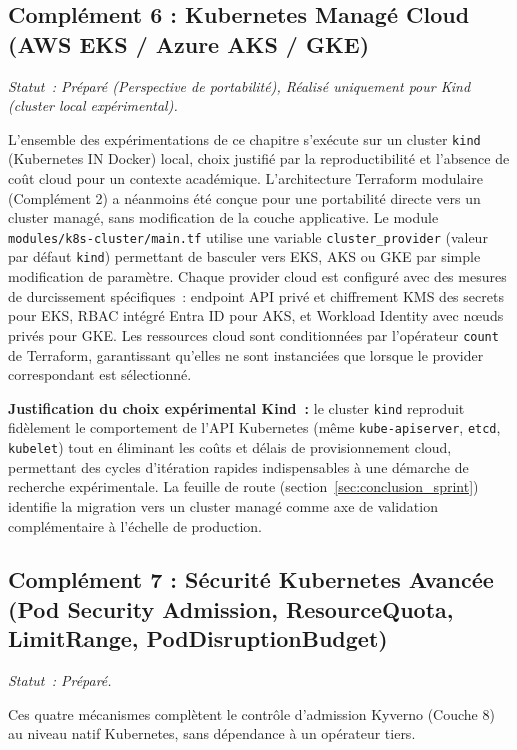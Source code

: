\subsection{Complément 6 : Kubernetes Managé Cloud (AWS EKS / Azure AKS / GKE)}
\label{subsec:comp_cloud_k8s}
\textit{Statut~: Préparé (Perspective de portabilité), Réalisé uniquement pour Kind (cluster local expérimental).}

L'ensemble des expérimentations de ce chapitre s'exécute sur un cluster \texttt{kind} (Kubernetes IN Docker) local, choix justifié par la reproductibilité et l'absence de coût cloud pour un contexte académique. L'architecture Terraform modulaire (Complément 2) a néanmoins été conçue pour une portabilité directe vers un cluster managé, sans modification de la couche applicative. Le module \texttt{modules/k8s-cluster/main.tf} utilise une variable \texttt{cluster\_provider} (valeur par défaut \texttt{kind}) permettant de basculer vers EKS, AKS ou GKE par simple modification de paramètre. Chaque provider cloud est configuré avec des mesures de durcissement spécifiques~: endpoint API privé et chiffrement KMS des secrets pour EKS, RBAC intégré Entra ID pour AKS, et Workload Identity avec nœuds privés pour GKE. Les ressources cloud sont conditionnées par l'opérateur \texttt{count} de Terraform, garantissant qu'elles ne sont instanciées que lorsque le provider correspondant est sélectionné.

\textbf{Justification du choix expérimental Kind~:} le cluster \texttt{kind} reproduit fidèlement le comportement de l'API Kubernetes (même \texttt{kube-apiserver}, \texttt{etcd}, \texttt{kubelet}) tout en éliminant les coûts et délais de provisionnement cloud, permettant des cycles d'itération rapides indispensables à une démarche de recherche expérimentale. La feuille de route (section~\ref{sec:conclusion_sprint}) identifie la migration vers un cluster managé comme axe de validation complémentaire à l'échelle de production.


\subsection{Complément 7 : Sécurité Kubernetes Avancée (Pod Security Admission, ResourceQuota, LimitRange, PodDisruptionBudget)}
\label{subsec:comp_k8s_security_avance}
\textit{Statut~: Préparé.}

Ces quatre mécanismes complètent le contrôle d'admission Kyverno (Couche 8) au niveau natif Kubernetes, sans dépendance à un opérateur tiers.

